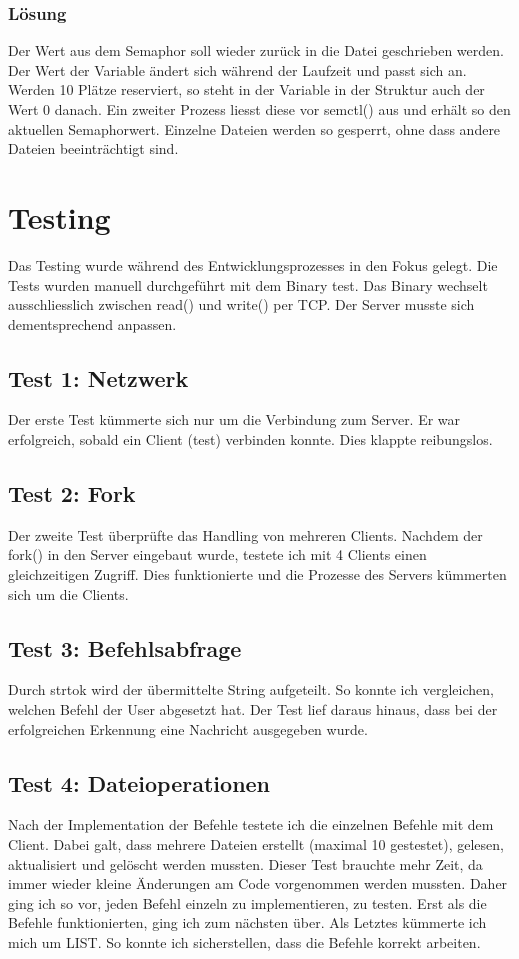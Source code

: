 \documentclass[12pt,a4paper,ngerman]{report}
\begin{document}
\subsubsection{Lösung}
Der Wert aus dem Semaphor soll wieder zurück in die Datei geschrieben werden. Der Wert der Variable ändert sich während der Laufzeit und passt sich an. Werden 10 Plätze reserviert, so steht in der Variable in der Struktur auch der Wert 0 danach. Ein zweiter Prozess liesst diese vor semctl() aus und erhält so den aktuellen Semaphorwert. Einzelne Dateien werden so gesperrt, ohne dass andere Dateien beeinträchtigt sind.
\section{Testing}
Das Testing wurde während des Entwicklungsprozesses in den Fokus gelegt. Die Tests wurden manuell durchgeführt mit dem Binary test. Das Binary wechselt ausschliesslich zwischen read() und write() per TCP. Der Server musste sich dementsprechend anpassen.
\subsection{Test 1: Netzwerk}
Der erste Test kümmerte sich nur um die Verbindung zum Server. Er war erfolgreich, sobald ein Client (test) verbinden konnte. Dies klappte reibungslos.
\subsection{Test 2: Fork}
Der zweite Test überprüfte das Handling von mehreren Clients. Nachdem der fork() in den Server eingebaut wurde, testete ich mit 4 Clients einen gleichzeitigen Zugriff. Dies funktionierte und die Prozesse des Servers kümmerten sich um die Clients.
\subsection{Test 3: Befehlsabfrage}
Durch strtok wird der übermittelte String aufgeteilt. So konnte ich vergleichen, welchen Befehl der User abgesetzt hat. Der Test lief daraus hinaus, dass bei der erfolgreichen Erkennung eine Nachricht ausgegeben wurde.
\subsection{Test 4: Dateioperationen}
Nach der Implementation der Befehle testete ich die einzelnen Befehle mit dem Client. Dabei galt, dass mehrere Dateien erstellt (maximal 10 gestestet), gelesen, aktualisiert und gelöscht werden mussten. Dieser Test brauchte mehr Zeit, da immer wieder kleine Änderungen am Code vorgenommen werden mussten. Daher ging ich so vor, jeden Befehl einzeln zu implementieren, zu testen. Erst als die Befehle funktionierten, ging ich zum nächsten über. Als Letztes kümmerte ich mich um LIST. So konnte ich sicherstellen, dass die Befehle korrekt arbeiten.
\end{document}
